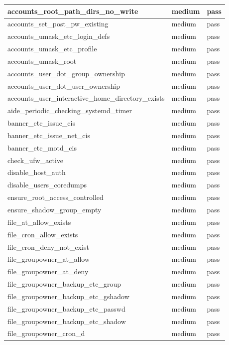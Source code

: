 \begin{longtable}{|p{10cm}|p{2cm}|p{2cm}|}
\hline
accounts\_root\_path\_dirs\_no\_write & medium & pass \\
\hline
accounts\_set\_post\_pw\_existing & medium & pass \\
\hline
accounts\_umask\_etc\_login\_defs & medium & pass \\
\hline
accounts\_umask\_etc\_profile & medium & pass \\
\hline
accounts\_umask\_root & medium & pass \\
\hline
accounts\_user\_dot\_group\_ownership & medium & pass \\
\hline
accounts\_user\_dot\_user\_ownership & medium & pass \\
\hline
accounts\_user\_interactive\_home\_directory\_exists & medium & pass \\
\hline
aide\_periodic\_checking\_systemd\_timer & medium & pass \\
\hline
banner\_etc\_issue\_cis & medium & pass \\
\hline
banner\_etc\_issue\_net\_cis & medium & pass \\
\hline
banner\_etc\_motd\_cis & medium & pass \\
\hline
check\_ufw\_active & medium & pass \\
\hline
disable\_host\_auth & medium & pass \\
\hline
disable\_users\_coredumps & medium & pass \\
\hline
ensure\_root\_access\_controlled & medium & pass \\
\hline
ensure\_shadow\_group\_empty & medium & pass \\
\hline
file\_at\_allow\_exists & medium & pass \\
\hline
file\_cron\_allow\_exists & medium & pass \\
\hline
file\_cron\_deny\_not\_exist & medium & pass \\
\hline
file\_groupowner\_at\_allow & medium & pass \\
\hline
file\_groupowner\_at\_deny & medium & pass \\
\hline
file\_groupowner\_backup\_etc\_group & medium & pass \\
\hline
file\_groupowner\_backup\_etc\_gshadow & medium & pass \\
\hline
file\_groupowner\_backup\_etc\_passwd & medium & pass \\
\hline
file\_groupowner\_backup\_etc\_shadow & medium & pass \\
\hline
file\_groupowner\_cron\_d & medium & pass \\

\end{longtable}
